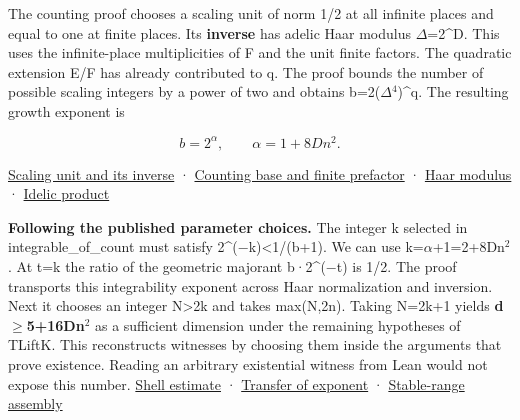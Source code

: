 \documentclass[11pt,letterpaper]{article}
\begin{document}
The counting proof chooses a scaling unit of norm 1/2 at all infinite places and equal to one at finite places. Its \textbf{inverse} has adelic Haar modulus \ensuremath{\Delta}=2\textasciicircum{}D. This uses the infinite-place multiplicities of F and the unit finite factors. The quadratic extension E/F has already contributed to q. The proof bounds the number of possible scaling integers by a power of two and obtains b=2(\ensuremath{\Delta}\ensuremath{{}^{4}})\textasciicircum{}q. The resulting growth exponent is

\[b=2^\alpha,\qquad \alpha=1+8Dn^2.\]

\href{https://github.com/nousentllc/riemann-hypothesis/blob/40e56bab026552e089d7afcfeff08d2defb9c005/src/Development/WeilBound/ThetaLifts/LatticeBasics/CompactBound.lean\#L23-L30}{Scaling unit and its inverse} · \href{https://github.com/nousentllc/riemann-hypothesis/blob/40e56bab026552e089d7afcfeff08d2defb9c005/src/Development/WeilBound/ThetaLifts/LatticeBasics/CompactBound.lean\#L149-L194}{Counting base and finite prefactor} · \href{https://github.com/nousentllc/riemann-hypothesis/blob/40e56bab026552e089d7afcfeff08d2defb9c005/src/Development/AbelianVarietyTheory/Proofs/DivisorProofs/LintegralInfiniteScaling.lean\#L41-L50}{Haar modulus} · \href{https://github.com/nousentllc/riemann-hypothesis/blob/40e56bab026552e089d7afcfeff08d2defb9c005/src/GroundTheory/GlobalFields/IdeleGroups/IdeleNorms.lean\#L98-L105}{Idelic product}

\textbf{Following the published parameter choices.} The integer k selected in {\ttfamily\small integrable\_\allowbreak{}of\_\allowbreak{}count} must satisfy 2\textasciicircum{}(\ensuremath{-}k)<1/(b+1). We can use k=\ensuremath{\alpha}+1=2+8Dn\ensuremath{{}^{2}}. At t=k the ratio of the geometric majorant b·2\textasciicircum{}(\ensuremath{-}t) is 1/2. The proof transports this integrability exponent across Haar normalization and inversion. Next it chooses an integer N>2k and takes max(N,2n). Taking N=2k+1 yields \textbf{d\ensuremath{\ge}5+16Dn\ensuremath{{}^{2}}} as a sufficient dimension under the remaining hypotheses of {\ttfamily\small TLiftK}. This reconstructs witnesses by choosing them inside the arguments that prove existence. Reading an arbitrary existential witness from Lean would not expose this number. \href{https://github.com/nousentllc/riemann-hypothesis/blob/40e56bab026552e089d7afcfeff08d2defb9c005/src/Development/WeilBound/ThetaLifts/LatticeBasics/HgtCount.lean\#L36-L75}{Shell estimate} · \href{https://github.com/nousentllc/riemann-hypothesis/blob/40e56bab026552e089d7afcfeff08d2defb9c005/src/Development/AutomorphicArithmetic/Foundations/GaloisRepresentations/ThetaParseval/ThetaKernels/TPGHgtFst.lean\#L30-L50}{Transfer of exponent} · \href{https://github.com/nousentllc/riemann-hypothesis/blob/40e56bab026552e089d7afcfeff08d2defb9c005/src/Development/AutomorphicArithmetic/Foundations/GaloisRepresentations/ThetaParseval/ThetaKernels/GalTPDefs.lean\#L141-L163}{Stable-range assembly}
\end{document}
